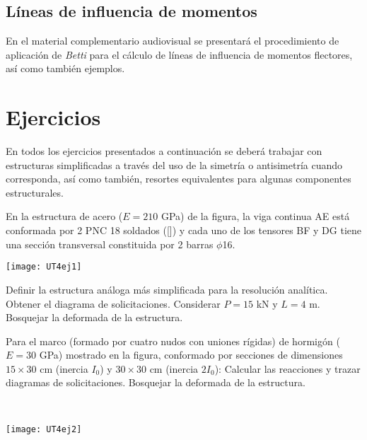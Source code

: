 \subsection{Líneas de influencia de momentos}

En el material complementario audiovisual se presentará el procedimiento de aplicación de \textit{Betti} para el cálculo de líneas de influencia de momentos flectores, así como también ejemplos.


\section{Ejercicios}
\setcounter{ejercicio}{0}

En todos los ejercicios presentados a continuación se deberá trabajar con estructuras simplificadas a través del uso de la simetría o antisimetría cuando corresponda, así como también, resortes equivalentes para algunas componentes estructurales. %
%



\ejercicio 

En la estructura de acero ($E=210$ GPa) de la figura, la viga continua AE está conformada por 2 PNC 18 soldados ([]) y cada uno de los tensores BF y DG tiene una sección transversal constituida por 2 barras $\phi$16. 

\begin{center}
	\texttt{[image: UT4ej1]}
\end{center}

\parte Definir la estructura análoga más simplificada para la resolución analítica.
\parte Obtener el diagrama de solicitaciones. Considerar $P=15$ kN y $L= 4$ m.
\parte Bosquejar la deformada de la estructura.




\ejercicio

\begin{minipage}[b]{0.58\textwidth}
%
Para el marco (formado por cuatro nudos con uniones rígidas) de hormigón ($E=30$ GPa) mostrado en la figura, conformado por secciones de dimensiones $15 \times 30$ cm (inercia $I_0$) y $30\times 30$ cm (inercia $2 I_0$):
%
\parte Calcular las reacciones y trazar diagramas de solicitaciones.
\parte Bosquejar la deformada de la estructura.
\end{minipage}
~
\begin{minipage}{0.4\textwidth}
\begin{center}
	\texttt{[image: UT4ej2]}
\end{center}
\end{minipage}




